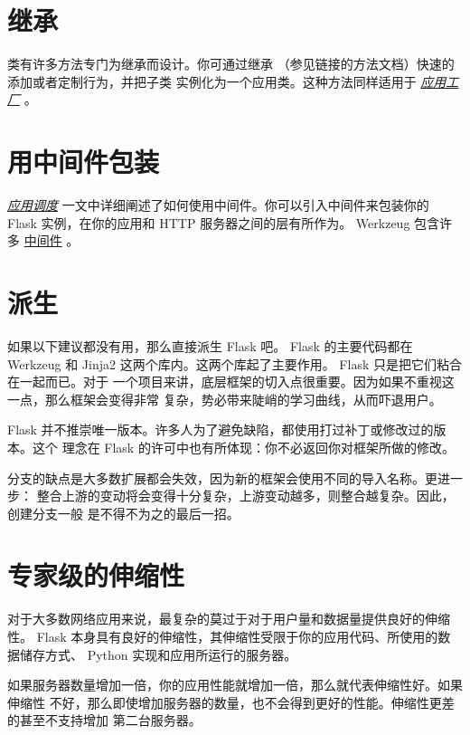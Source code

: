 \documentclass[a4paper,12pt]{sphinxmanual}
\begin{document}
\section{继承}
\label{becomingbig:id4}
{\hyperref[api:flask.Flask]{}} 类有许多方法专门为继承而设计。你可通过继承
{\hyperref[api:flask.Flask]{}} （参见链接的方法文档）快速的添加或者定制行为，并把子类
实例化为一个应用类。这种方法同样适用于 {\hyperref[patterns/appfactories:app-factories]{\emph{应用工厂}}} 。


\section{用中间件包装}
\label{becomingbig:id5}
{\hyperref[patterns/appdispatch:app-dispatch]{\emph{应用调度}}} 一文中详细阐述了如何使用中间件。你可以引入中间件来包装你的
Flask 实例，在你的应用和 HTTP 服务器之间的层有所作为。
Werkzeug 包含许多 \href{http://werkzeug.pocoo.org/docs/middlewares/}{中间件} 。


\section{派生}
\label{becomingbig:id7}
如果以下建议都没有用，那么直接派生 Flask 吧。 Flask 的主要代码都在 Werkzeug 和
Jinja2 这两个库内。这两个库起了主要作用。 Flask 只是把它们粘合在一起而已。对于
一个项目来讲，底层框架的切入点很重要。因为如果不重视这一点，那么框架会变得非常
复杂，势必带来陡峭的学习曲线，从而吓退用户。

Flask 并不推崇唯一版本。许多人为了避免缺陷，都使用打过补丁或修改过的版本。这个
理念在 Flask 的许可中也有所体现：你不必返回你对框架所做的修改。

分支的缺点是大多数扩展都会失效，因为新的框架会使用不同的导入名称。更进一步：
整合上游的变动将会变得十分复杂，上游变动越多，则整合越复杂。因此，创建分支一般
是不得不为之的最后一招。


\section{专家级的伸缩性}
\label{becomingbig:id8}
对于大多数网络应用来说，最复杂的莫过于对于用户量和数据量提供良好的伸缩性。
Flask 本身具有良好的伸缩性，其伸缩性受限于你的应用代码、所使用的数据储存方式、
Python 实现和应用所运行的服务器。

如果服务器数量增加一倍，你的应用性能就增加一倍，那么就代表伸缩性好。如果伸缩性
不好，那么即使增加服务器的数量，也不会得到更好的性能。伸缩性更差的甚至不支持增加
第二台服务器。
\end{document}

